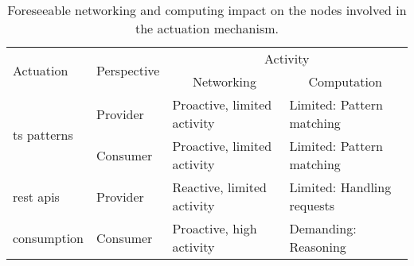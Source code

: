 
\begin{table}[htbp]
  \caption{Foreseeable networking and computing impact on the nodes involved in the actuation mechanism.}
  \begin{center}
    \footnotesize
    \begin{tabular}{llp{4cm}p{4cm}}
      \hline
      \multirow{2}{*}{Actuation} &
      \multirow{2}{*}{Perspective} &
      \multicolumn{2}{c}{Activity} \\
      ~ &
      ~ &
      \multicolumn{1}{c}{Networking} &
      \multicolumn{1}{c}{Computation} \\
      \hline
      \multirow{2}{*}{\ac{ts} patterns} & Provider & Proactive, limited activity & Limited: Pattern matching \\
				    ~ & Consumer & Proactive, limited activity & Limited: Pattern matching \\[0.2cm]
      \ac{rest} \acp{api} & Provider & Reactive, limited activity & Limited: Handling requests \\
        consumption       & Consumer & Proactive, high activity &  Demanding: Reasoning \\ %
      \hline
    \end{tabular}
  \end{center}
  \label{tab:actuation_networking_computing}
\end{table}
